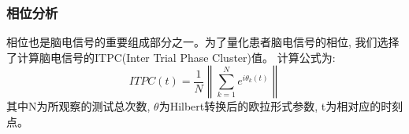 %
%
%
%

%

\subsubsection{相位分析}
相位也是脑电信号的重要组成部分之一。为了量化患者脑电信号的相位,
我们选择了计算脑电信号的ITPC(Inter Trial Phase Cluster)值\cite{gu2010phase}。
计算公式为:
\begin{equation}
    ITPC(t) = \frac{1}{N} \left\| \sum_{k=1}^N e^{i \theta_k(t)} \right\|
\end{equation}
其中N为所观察的测试总次数, $\theta$为Hilbert转换后的欧拉形式参数, t为相对应的时刻点。

